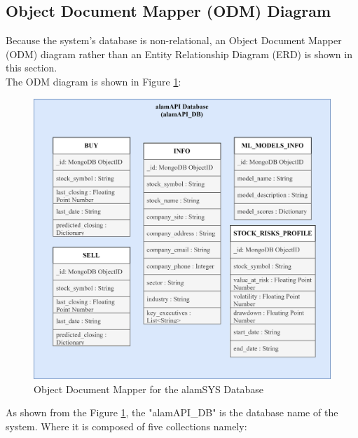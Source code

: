 \subsection{Object Document Mapper (ODM) Diagram}
\label{subsec:odm_subsec}
Because the system's database is non-relational, an Object Document Mapper (ODM) 
diagram rather than an Entity Relationship Diagram (ERD) is shown in this section.
\hfill \\

The ODM diagram is shown in Figure \ref{fig:odm}:
\begin{figure}[ht]
    \centering
    \includegraphics[width=1\textwidth]{./assets/Chapter_3/ODM/ODM.png}
    \caption{Object Document Mapper for the alamSYS Database}
    \label{fig:odm}
\end{figure}
\FloatBarrier
As shown from the Figure \ref{fig:odm}, the "alamAPI\_DB" is the database
name of the system. Where it is composed of five collections namely:
